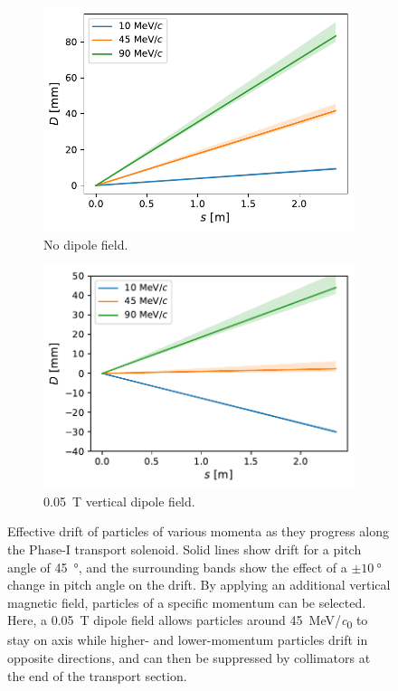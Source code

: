 \begin{figure}
    \centering
    \begin{subfigure}[b]{0.46\textwidth}
        \centering
        \hspace{-0.8cm}
        \includegraphics[width=\textwidth]{chapter2/drift_vs_s_0mT.pdf}
        \caption{No dipole field.}
    \end{subfigure}
    \hfill
    \begin{subfigure}[b]{0.46\textwidth}
        \centering
        \hspace{-0.8cm}
        \includegraphics[width=\textwidth]{chapter2/drift_vs_s_0.05mT.pdf}
        \caption{\SI{0.05}{\tesla} vertical dipole field.}
    \end{subfigure}
    \caption{ Effective drift of particles of various momenta as they progress
        along the Phase-I transport solenoid. Solid lines show drift for a pitch
        angle of \SI{45}{\degree}, and the surrounding bands show the effect of
        a $\pm \SI{10}{\degree}$ change in pitch angle on the drift. By applying
        an additional vertical magnetic field, particles of a specific momentum
        can be selected. Here, a \SI{0.05}{\tesla} dipole field allows
        particles around \SI{45}{\MeV/\clight} to stay on axis while higher- and
        lower-momentum particles drift in opposite directions, and can then be
        suppressed by collimators at the end of the transport section. }
    \label{fig:drift}
\end{figure}


